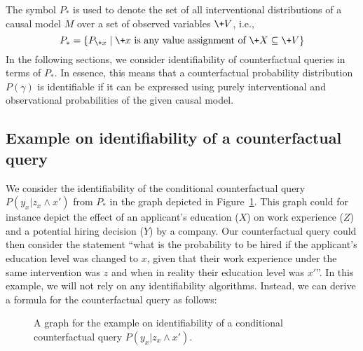 The symbol \(P_*\) is used to denote the set of all interventional distributions of a causal model \(M\) over a set of observed variables \(\+ V\), i.e., 
\[
P_* = \{P_{\+x} \mid \+ x \text{ is any value assignment of }\+ X \subseteq \+ V\}
\]
In the following sections, we consider identifiability of counterfactual queries in terms of \(P_*\). In essence, this means that a counterfactual probability distribution \(P(\gamma)\) is identifiable if it can be expressed using purely interventional and observational probabilities of the given causal model.

\subsection{Example on identifiability of a counterfactual query} \label{sec:example}

We consider the identifiability of the conditional counterfactual query \(P(y_x|z_x \wedge x')\) from \(P_*\) in the graph depicted in Figure~\ref{fig:graphG}. This graph could for instance depict the effect of an applicant's education (\(X\)) on work experience (\(Z\)) and a potential hiring decision (\(Y\)) by a company. Our counterfactual query could then consider the statement ``what is the probability to be hired if the applicant's education level was changed to \(x\), given that their work experience under the same intervention was \(z\) and when in reality their education level was \(x'\)''. In this example, we will not rely on any identifiability algorithms. Instead, we can derive a formula for the counterfactual query as follows:
\begin{figure}[ht]
\begin{center}
\end{center}
\caption{A graph for the example on identifiability of a conditional counterfactual query \(P(y_x|z_x \wedge x')\).}
\label{fig:graphG}
\end{figure}

